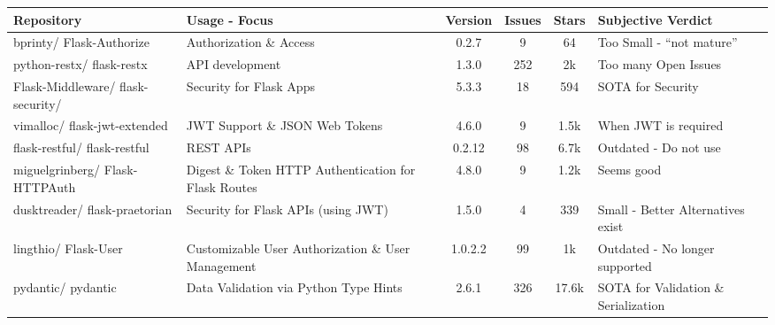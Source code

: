 \begin{changemargin}{-1.5cm}{0cm}
    \centering
    \begin{tabular}{|M{3.0cm}||m{5.0cm}|c|c|c|m{4.0cm}|}
        \hline
            \textbf{Repository} & \textbf{Usage - Focus} & \textbf{Version} & \textbf{Issues} & \textbf{Stars} & Subjective Verdict \\
        \hline
        bprinty/ Flask-Authorize & Authorization \& Access & 0.2.7 & 9 & 64 & Too Small - “not mature” \\
        \hline
        python-restx/ flask-restx & API development & 1.3.0 & 252 & 2k & Too many Open Issues \\
        \hline
        Flask-Middleware/ flask-security/ & Security for Flask Apps & 5.3.3 & 18 & 594 & SOTA for Security  \\
        \hline
        vimalloc/ flask-jwt-extended & JWT Support \& JSON Web Tokens & 4.6.0 & 9 & 1.5k & When JWT is required \\
        \hline
        flask-restful/ flask-restful & REST APIs & 0.2.12 & 98 & 6.7k & Outdated - Do not use \\
        \hline
        miguelgrinberg/ Flask-HTTPAuth &  Digest \& Token HTTP Authentication for Flask Routes & 4.8.0 & 9 & 1.2k & Seems good \\
        \hline
        dusktreader/ flask-praetorian & Security for Flask APIs (using JWT) & 1.5.0 & 4 & 339 & Small - Better Alternatives exist \\
        \hline
        lingthio/ Flask-User & Customizable User Authorization \& User Management & 1.0.2.2 & 99 & 1k & Outdated - No longer supported \\
        \hline
        pydantic/ pydantic &  Data Validation via Python Type Hints & 2.6.1 & 326 & 17.6k &  SOTA for Validation \& Serialization \\
        \hline
    \end{tabular}
    \label{table:implementation_details_notion_subset}
\end{changemargin}
